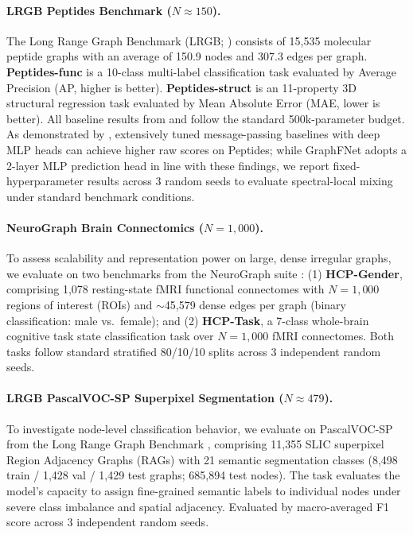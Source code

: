 \documentclass[10pt]{article}
\begin{document}
\paragraph{LRGB Peptides Benchmark ($N \approx 150$).} The Long Range Graph Benchmark (LRGB; \citealt{dwivedi2022long}) consists of 15,535 molecular peptide graphs with an average of 150.9 nodes and 307.3 edges per graph. \textbf{Peptides-func} is a 10-class multi-label classification task evaluated by Average Precision (AP, higher is better). \textbf{Peptides-struct} is an 11-property 3D structural regression task evaluated by Mean Absolute Error (MAE, lower is better). All baseline results from \citet{dwivedi2022long} and \citet{rampasek2022recipe} follow the standard 500k-parameter budget. As demonstrated by \citet{tonshoff2024where}, extensively tuned message-passing baselines with deep MLP heads can achieve higher raw scores on Peptides; while GraphFNet adopts a 2-layer MLP prediction head in line with these findings, we report fixed-hyperparameter results across 3 random seeds to evaluate spectral-local mixing under standard benchmark conditions.

\paragraph{NeuroGraph Brain Connectomics ($N = 1{,}000$).} To assess scalability and representation power on large, dense irregular graphs, we evaluate on two benchmarks from the NeuroGraph suite \citep{said2023neurograph}: (1) \textbf{HCP-Gender}, comprising 1,078 resting-state fMRI functional connectomes with $N=1,000$ regions of interest (ROIs) and $\sim$45,579 dense edges per graph (binary classification: male vs.\ female); and (2) \textbf{HCP-Task}, a 7-class whole-brain cognitive task state classification task over $N=1,000$ fMRI connectomes. Both tasks follow standard stratified 80/10/10 splits across 3 independent random seeds.

\paragraph{LRGB PascalVOC-SP Superpixel Segmentation ($N \approx 479$).} To investigate node-level classification behavior, we evaluate on PascalVOC-SP from the Long Range Graph Benchmark \citep{dwivedi2022long}, comprising 11,355 SLIC superpixel Region Adjacency Graphs (RAGs) with 21 semantic segmentation classes (8,498 train / 1,428 val / 1,429 test graphs; 685,894 test nodes). The task evaluates the model's capacity to assign fine-grained semantic labels to individual nodes under severe class imbalance and spatial adjacency. Evaluated by macro-averaged F1 score across 3 independent random seeds.
\end{document}
